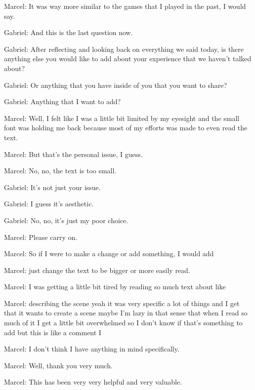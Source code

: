 Marcel: It was way more similar to the games that I played in the past, I would say.

Gabriel: And this is the last question now.

Gabriel: After reflecting and looking back on everything we said today, is there anything else you would like to add about your experience that we haven't talked about?

Gabriel: Or anything that you have inside of you that you want to share?

Gabriel: Anything that I want to add?

Marcel: Well, I felt like I was a little bit limited by my eyesight and the small font was holding me back because most of my efforts was made to even read the text.

Marcel: But that's the personal issue, I guess.

Marcel: No, no, the text is too small.

Gabriel: It's not just your issue.

Gabriel: I guess it's aesthetic.

Gabriel: No, no, it's just my poor choice.

Marcel: Please carry on.

Marcel: So if I were to make a change or add something, I would add

Marcel: just change the text to be bigger or more easily read.

Marcel: I was getting a little bit tired by reading so much text about like

Marcel: describing the scene yeah it was very specific a lot of things and I get that it wants to create a scene maybe I'm lazy in that sense that when I read so much of it I get a little bit overwhelmed so I don't know if that's something to add but this is like a comment I

Marcel: I don't think I have anything in mind specifically.

Marcel: Well, thank you very much.

Marcel: This has been very very helpful and very valuable.









